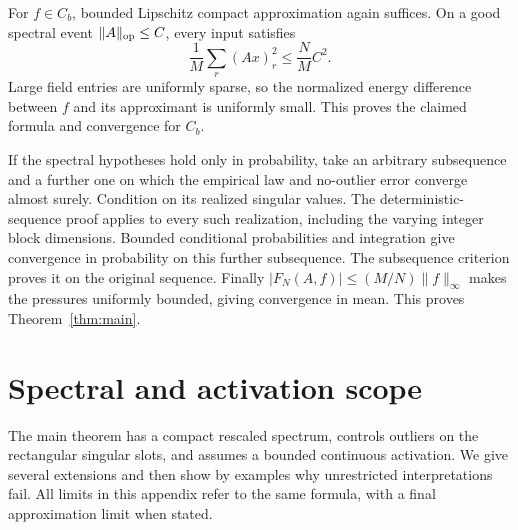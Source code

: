 \documentclass[11pt]{article}
\numberwithin{equation}{section}
\theoremstyle{definition}
\newcommand{\norm}[1]{\lVert #1\rVert}
\begin{document}
For $f\in C_b$, bounded Lipschitz compact approximation again suffices. On a good spectral event $\norm A_{\rm op}\le C$, every input satisfies
\[
\frac1M\sum_r(Ax)_r^2\le\frac NM C^2.
\]
Large field entries are uniformly sparse, so the normalized energy difference between $f$ and its approximant is uniformly small. This proves the claimed formula and convergence for $C_b$.

If the spectral hypotheses hold only in probability, take an arbitrary subsequence and a further one on which the empirical law and no-outlier error converge almost surely. Condition on its realized singular values. The deterministic-sequence proof applies to every such realization, including the varying integer block dimensions. Bounded conditional probabilities and integration give convergence in probability on this further subsequence. The subsequence criterion proves it on the original sequence. Finally $|F_N(A,f)|\le(M/N)\norm f_\infty$ makes the pressures uniformly bounded, giving convergence in mean. This proves Theorem~\ref{thm:main}.

\appendix
\section{Spectral and activation scope}
\label{sec:scope}
The main theorem has a compact rescaled spectrum, controls outliers on the rectangular singular slots, and assumes a bounded continuous activation. We give several extensions and then show by examples why unrestricted interpretations fail. All limits in this appendix refer to the same formula, with a final approximation limit when stated.
\end{document}
